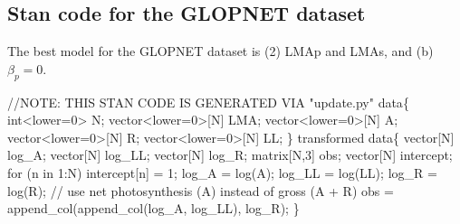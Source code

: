 \documentclass[
  12pt,
  letterpaper,
  DIV=11,
  numbers=noendperiod]{scrartcl}
\newenvironment{Shaded}{\begin{snugshade}}{\end{snugshade}}
\newcommand{\AlertTok}[1]{\textcolor[rgb]{0.68,0.00,0.00}{#1}}
\newcommand{\CommentTok}[1]{\textcolor[rgb]{0.37,0.37,0.37}{#1}}
\newcommand{\ControlFlowTok}[1]{\textcolor[rgb]{0.00,0.23,0.31}{#1}}
\newcommand{\DataTypeTok}[1]{\textcolor[rgb]{0.68,0.00,0.00}{#1}}
\newcommand{\DecValTok}[1]{\textcolor[rgb]{0.68,0.00,0.00}{#1}}
\newcommand{\KeywordTok}[1]{\textcolor[rgb]{0.00,0.23,0.31}{#1}}
\newcommand{\NormalTok}[1]{\textcolor[rgb]{0.00,0.23,0.31}{#1}}
\begin{document}
\hypertarget{stan-code-for-the-glopnet-dataset}{%
\subsection{Stan code for the GLOPNET
dataset}\label{stan-code-for-the-glopnet-dataset}}

The best model for the GLOPNET dataset is (2) LMAp and LMAs, and (b)
\(\beta_p = 0\).

\begin{Shaded}
\begin{Highlighting}[]
\CommentTok{//}\AlertTok{NOTE}\CommentTok{: THIS STAN CODE IS GENERATED VIA "update.py"}
\KeywordTok{data}\NormalTok{\{}
  \DataTypeTok{int}\NormalTok{\textless{}}\KeywordTok{lower}\NormalTok{=}\DecValTok{0}\NormalTok{\textgreater{} N;}
  \DataTypeTok{vector}\NormalTok{\textless{}}\KeywordTok{lower}\NormalTok{=}\DecValTok{0}\NormalTok{\textgreater{}[N] LMA;}
  \DataTypeTok{vector}\NormalTok{\textless{}}\KeywordTok{lower}\NormalTok{=}\DecValTok{0}\NormalTok{\textgreater{}[N] A;}
  \DataTypeTok{vector}\NormalTok{\textless{}}\KeywordTok{lower}\NormalTok{=}\DecValTok{0}\NormalTok{\textgreater{}[N] R;}
  \DataTypeTok{vector}\NormalTok{\textless{}}\KeywordTok{lower}\NormalTok{=}\DecValTok{0}\NormalTok{\textgreater{}[N] LL;}
\NormalTok{\}}
\KeywordTok{transformed data}\NormalTok{\{}
  \DataTypeTok{vector}\NormalTok{[N] log\_A;}
  \DataTypeTok{vector}\NormalTok{[N] log\_LL;}
  \DataTypeTok{vector}\NormalTok{[N] log\_R;}
  \DataTypeTok{matrix}\NormalTok{[N,}\DecValTok{3}\NormalTok{] obs;}
  \DataTypeTok{vector}\NormalTok{[N] intercept;}
  \ControlFlowTok{for}\NormalTok{ (n }\ControlFlowTok{in} \DecValTok{1}\NormalTok{:N)}
\NormalTok{    intercept[n] = }\DecValTok{1}\NormalTok{;}
\NormalTok{  log\_A = log(A);}
\NormalTok{  log\_LL = log(LL);}
\NormalTok{  log\_R = log(R);}
  \CommentTok{// use net photosynthesis (A) instead of gross (A + R)}
\NormalTok{  obs = append\_col(append\_col(log\_A, log\_LL), log\_R);}
\NormalTok{\}}


\end{Highlighting}
\end{Shaded}
\end{document}
